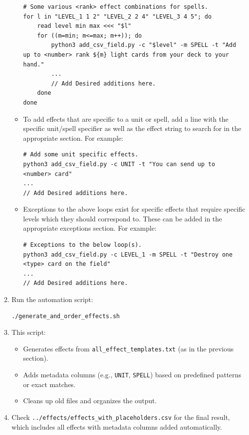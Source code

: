 \begin{enumerate}
\begin{itemize}
\begin{lstlisting}[style=shellstyle]
# Some various <rank> effect combinations for spells.
for l in "LEVEL_1 1 2" "LEVEL_2 2 4" "LEVEL_3 4 5"; do
	read level min max <<< "$l"
	for ((m=min; m<=max; m++)); do
		python3 add_csv_field.py -c "$level" -m SPELL -t "Add up to <number> rank ${m} light cards from your deck to your hand."
		...
		// Add Desired additions here.
	done
done
\end{lstlisting}
	\item To add effects that are specific to a unit or spell, add a line with the specific unit/spell specifier as well as the effect string to search for in the appropriate section. For example:
	\begin{lstlisting}[style=shellstyle]
# Add some unit specific effects.
python3 add_csv_field.py -c UNIT -t "You can send up to <number> card"
...
// Add Desired additions here.
	\end{lstlisting}
	\item Exceptions to the above loops exist for specific effects that require specific levels which they should correspond to. These can be added in the appropriate exceptions section. For example:
\begin{lstlisting}[style=shellstyle]
# Exceptions to the below loop(s).
python3 add_csv_field.py -c LEVEL_1 -m SPELL -t "Destroy one <type> card on the field"
...
// Add Desired additions here.
\end{lstlisting}
\end{itemize}
	\item Run the automation script:
\begin{lstlisting}[style=terminalstyle]
./generate_and_order_effects.sh
\end{lstlisting}
	\item This script:
	\begin{itemize}
		\item Generates effects from \texttt{all\_effect\_templates.txt} (as in the previous section).
		\item Adds metadata columns (e.g., \texttt{UNIT}, \texttt{SPELL}) based on predefined patterns or exact matches.
		\item Cleans up old files and organizes the output.
	\end{itemize}
	\item Check \texttt{../effects/effects\_with\_placeholders.csv} for the final result, which includes all effects with metadata columns added automatically.
\end{enumerate}

